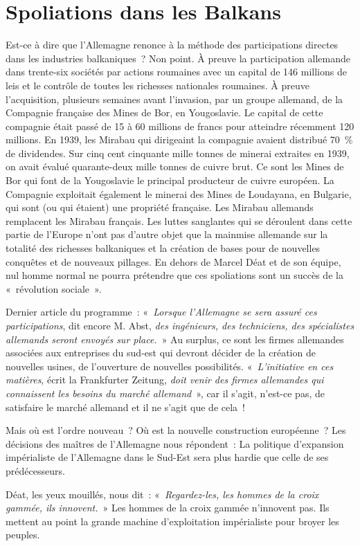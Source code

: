 \documentclass[french,twoside]{book} %
\begin{document}
\section[Spoliations dans les Balkans]{Spoliations dans les Balkans}
\noindent Est-ce à dire que l’Allemagne renonce à la méthode des participations directes dans les industries balkaniques ? Non point. À preuve la participation allemande dans trente-six sociétés par actions roumaines avec un capital de 146 millions de leis et le contrôle de toutes les richesses nationales roumaines. À preuve l’acquisition, plusieurs semaines avant l’invasion, par un groupe allemand, de la Compagnie française des Mines de Bor, en Yougoslavie. Le capital de cette compagnie était passé de 15 à 60 millions de francs pour atteindre récemment 120 millions. En 1939, les Mirabau qui dirigeaint la compagnie avaient distribué 70 \% de dividendes. Sur cinq cent cinquante mille tonnes de minerai extraites en 1939, on avait évalué quarante-deux mille tonnes de cuivre brut. Ce sont les Mines de Bor qui font de la Yougoslavie le principal producteur de cuivre européen. La Compagnie exploitait également le minerai des Mines de Loudayana, en Bulgarie, qui sont (ou qui étaient) une propriété française. Les Mirabau allemands remplacent les Mirabau français. Les luttes sanglantes qui se déroulent dans cette partie de l’Europe n’ont pas d’autre objet que la mainmise allemande sur la totalité des richesses balkaniques et la création de bases pour de nouvelles conquêtes et de nouveaux pillages. En dehors de Marcel Déat et de son équipe, nul homme normal ne pourra prétendre que ces spoliations sont un succès de la « révolution sociale ».\par
Dernier article du programme : «\emph{ Lorsque l’Allemagne se sera assuré ces participations}, dit encore M. Abst, \emph{des ingénieurs, des techniciens, des spécialistes allemands seront envoyés sur place.} » Au surplus, ce sont les firmes allemandes associées aux entreprises du sud-est qui devront décider de la création de nouvelles usines, de l’ouverture de nouvelles possibilités. « \emph{L’initiative en ces matières}, écrit la Frankfurter Zeitung, \emph{doit venir des firmes allemandes qui connaissent les besoins du marché allemand} », car il s’agit, n’est-ce pas, de satisfaire le marché allemand et il ne s’agit que de cela !\par
Mais où est l’ordre nouveau ? Où est la nouvelle construction européenne ? Les décisions des maîtres de l’Allemagne nous répondent : La politique d’expansion impérialiste de l’Allemagne dans le Sud-Est sera plus hardie que celle de ses prédécesseurs.\par
Déat, les yeux mouillés, nous dit : « \emph{Regardez-les, les hommes de la croix gammée, ils innovent.} » Les hommes de la croix gammée n’innovent pas. Ils mettent au point la grande machine d’exploitation impérialiste pour broyer les peuples.
\end{document}
